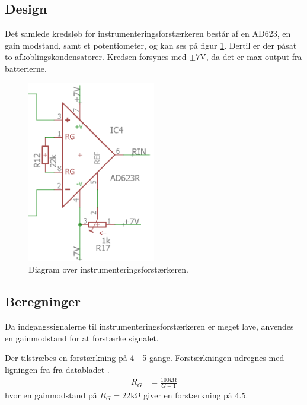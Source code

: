 \subsection{Design}
Det samlede kredsløb for instrumenteringsforstærkeren består af en AD623, en gain modstand, samt et potentiometer, og kan ses på figur \ref{fig:instrumentation_amplifier}. Dertil er der påsat to afkoblingskondensatorer. Kredsen forsynes med $\pm 7 \si{\volt}$, da det er max output fra batterierne. 
\begin{figure}[h!]
	\centering
	\includegraphics[width=0.5\textwidth]{billeder/instrumentation_amplifier.png}
	\caption{Diagram over instrumenteringsforstærkeren.}
	\label{fig:instrumentation_amplifier}
\end{figure}
\subsection{Beregninger}
Da indgangssignalerne til instrumenteringsforstærkeren er meget lave, anvendes en gainmodstand for at forstærke signalet.

Der tilstræbes en forstærkning på 4 - 5 gange. Forstærkningen udregnes med ligningen fra fra databladet \cite[side 11]{AD623}.
\begin{align}
	R_G & = \frac{100 \si{\kilo\ohm}}{G-1}
\end{align}
hvor en gainmodstand på $R_G = 22 \si{\kilo\ohm}$ giver en forstærkning på \num{4.5}.